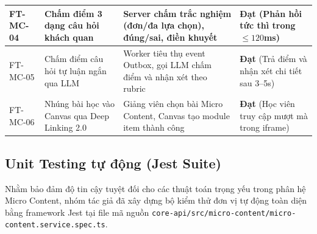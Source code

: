 \begin{longtable}{|p{1.8cm}|p{4.2cm}|p{4.2cm}|p{3.6cm}|}
    FT-MC-04 & Chấm điểm 3 dạng câu hỏi khách quan & Server chấm trắc nghiệm (đơn/đa lựa chọn), đúng/sai, điền khuyết & \textbf{Đạt} (Phản hồi tức thì trong $\le 120$ms) \\ \hline
    FT-MC-05 & Chấm điểm câu hỏi tự luận ngắn qua LLM & Worker tiêu thụ event Outbox, gọi LLM chấm điểm và nhận xét theo rubric & \textbf{Đạt} (Trả điểm và nhận xét chi tiết sau 3--5s) \\ \hline
    FT-MC-06 & Nhúng bài học vào Canvas qua Deep Linking 2.0 & Giảng viên chọn bài Micro Content, Canvas tạo module item thành công & \textbf{Đạt} (Học viên truy cập mượt mà trong iframe) \\ \hline
\end{longtable}

\subsection{Unit Testing tự động (Jest Suite)}
\label{subsec:unit-tests-lvtn}

Nhằm bảo đảm độ tin cậy tuyệt đối cho các thuật toán trọng yếu trong phân hệ Micro Content, nhóm tác giả đã xây dựng bộ kiểm thử đơn vị tự động toàn diện bằng framework Jest tại file mã nguồn \texttt{core-api/src/micro-content/micro-content.service.spec.ts}.


